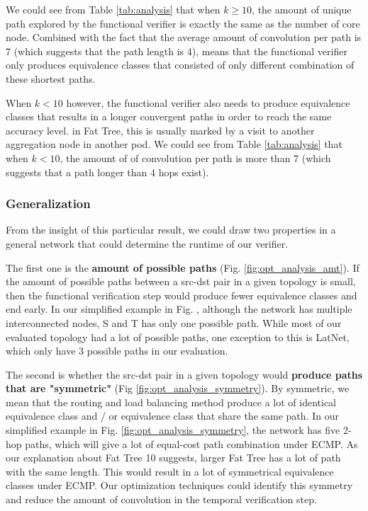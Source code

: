 We could see from Table \ref{tab:analysis} that when $k \geq 10$, the amount of unique path explored by the 
functional verifier is exactly the same as the number of core node. 
Combined with the fact that the average amount of convolution per path is 7 (which suggests that the path 
length is 4), means that the functional verifier only produces equivalence classes that consisted of only 
different combination of these shortest paths.

When $k < 10$ however, the functional verifier also needs to produce equivalence classes that results 
in a longer convergent paths in order to reach the same accuracy level.
in Fat Tree, this is usually marked by a visit to another aggregation node in another pod. 
We could see from Table \ref{tab:analysis} that when $k < 10$, the amount of of convolution per path is more 
than 7 (which suggests that a path longer than 4 hops exist).

\subsubsection{Generalization}
From the insight of this particular result, we could draw two properties in a general network that could 
determine the runtime of our verifier.

The first one is the \textbf{amount of possible paths} (Fig. \ref{fig:opt_analysis_amt}).
If the amount of possible paths between a src-dst pair in a given topology is small, then the functional 
verification step would produce fewer equivalence classes and end early.
In our simplified example in Fig. \label{fig:opt_analysis_amt}, although the network has multiple interconnected
nodes, S and T has only one possible path.
While most of our evaluated topology had a lot of possible paths, one exception to this is LatNet, which 
only have 3 possible paths in our evaluation.

The second is whether the src-dst pair in a given topology would \textbf{produce paths that are "symmetric"}
(Fig \ref{fig:opt_analysis_symmetry}).
By symmetric, we mean that the routing and load balancing method produce a lot of identical equivalence class 
and / or equivalence class that share the same path.
In our simplified example in Fig. \ref{fig:opt_analysis_symmetry}, the network has five 2-hop paths, which will give a 
lot of equal-cost path combination under ECMP.
As our explanation about Fat Tree 10 suggests, larger Fat Tree has a lot of path with the same length.
This would result in a lot of symmetrical equivalence classes under ECMP.
Our optimization techniques could identify this symmetry and reduce the amount of convolution in the temporal 
verification step.

